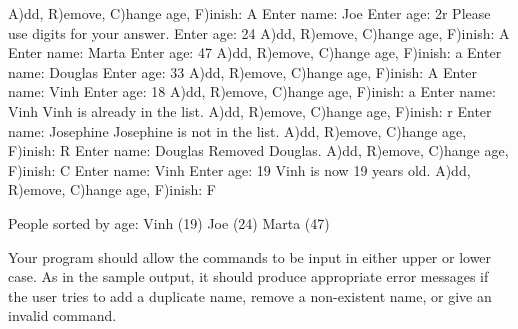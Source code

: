 \begin{exercise}
\begin{stdout}
A)dd, R)emove, C)hange age, F)inish: A
Enter name: Joe
Enter age: 2r
Please use digits for your answer.
Enter age: 24
A)dd, R)emove, C)hange age, F)inish: A
Enter name: Marta 
Enter age: 47
A)dd, R)emove, C)hange age, F)inish: a
Enter name: Douglas
Enter age: 33
A)dd, R)emove, C)hange age, F)inish: A
Enter name: Vinh
Enter age: 18
A)dd, R)emove, C)hange age, F)inish: a
Enter name: Vinh
Vinh is already in the list.
A)dd, R)emove, C)hange age, F)inish: r
Enter name: Josephine
Josephine is not in the list.
A)dd, R)emove, C)hange age, F)inish: R
Enter name: Douglas
Removed Douglas.
A)dd, R)emove, C)hange age, F)inish: C
Enter name: Vinh
Enter age: 19
Vinh is now 19 years old.
A)dd, R)emove, C)hange age, F)inish: F

People sorted by age:
Vinh (19)
Joe (24)
Marta (47)
\end{stdout}

Your program should allow the commands to be input in either upper or lower case. As in the sample output, it should produce appropriate error messages if the user tries to add a duplicate name, remove a non-existent name, or give an invalid command.

\end{exercise}


